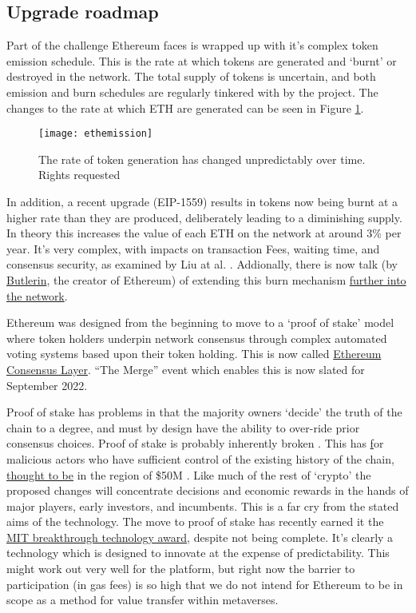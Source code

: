 \subsection{Upgrade roadmap}
Part of the challenge Ethereum faces is wrapped up with it's complex token emission schedule. This is the rate at which tokens are generated and `burnt' or destroyed in the network. The total supply of tokens is uncertain, and both emission and burn schedules are regularly tinkered with by the project. The changes to the rate at which ETH are generated can be seen in Figure \ref{fig:ethemission}.
\begin{figure}
  \centering
    \texttt{[image: ethemission]}
  \caption{The rate of token generation has changed unpredictably over time. Rights requested}
  \label{fig:ethemission}
\end{figure}
In addition, a recent upgrade (EIP-1559) results in tokens now being burnt at a higher rate than they are produced, deliberately leading to a diminishing supply. In theory this increases the value of each ETH on the network at around 3\% per year. It's very complex, with impacts on transaction Fees, waiting time, and consensus security, as examined by Liu at al. \cite{liu2022empirical}. Addionally, there is now talk (by \href{https://time.com/6158182/vitalik-buterin-ethereum-profile/}{Butlerin}, the creator of Ethereum) of extending this burn mechanism \href{https://ethresear.ch/t/multidimensional-eip-1559/11651}{further into the network}.\par
Ethereum was designed from the beginning to move to a `proof of stake' model where token holders underpin network consensus through complex automated voting systems based upon their token holding. This is now called \href{https://blog.ethereum.org/2022/01/24/the-great-eth2-renaming/}{Ethereum Consensus Layer}. ``The Merge'' event which enables this is now slated for September 2022.\par
Proof of stake has problems in that the majority owners `decide' the truth of the chain to a degree, and must by design have the ability to over-ride prior consensus choices. Proof of stake is probably inherently broken \cite{poelstra2015stake}. This has \href{https://notes.ethereum.org/@djrtwo/risks-of-lsd} for malicious actors who have sufficient control of the existing history of the chain, \href{https://twitter.com/MTorgin/status/1521433474820890624}{thought to be} in the region of \$50M \cite{mackinga2022twap}. Like much of the rest of `crypto' the proposed changes will concentrate decisions and economic rewards in the hands of major players, early investors, and incumbents. This is a far cry from the stated aims of the technology. The move to proof of stake has recently earned it the \href{https://www.technologyreview.com/2022/02/23/1044960/proof-of-stake-cryptocurrency/}{MIT breakthrough technology award}, despite not being complete. It's clearly a technology which is designed to innovate at the expense of predictability. This might work out very well for the platform, but right now the barrier to participation (in gas fees) is so high that we do not intend for Ethereum to be in scope as a method for value transfer within metaverses.\par


